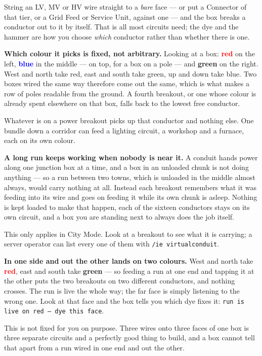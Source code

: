 String an LV, MV or HV wire straight to a \emph{bare} face --- or put a Connector of that tier, or a
Grid Feed or Service Unit, against one --- and the box breaks a conductor out to it by itself. That
is all most circuits need; the dye and the hammer are how you choose \emph{which} conductor rather
than whether there is one.

\textbf{Which colour it picks is fixed, not arbitrary.} Looking at a box: \textcolor{red}{\textbf{red}}
on the left, \textcolor{blue}{\textbf{blue}} in the middle --- on top, for a box on a pole ---
and \textcolor{green!50!black}{\textbf{green}} on the right. West and north take red, east and south
take green, up and down take blue. Two boxes wired the same way therefore come out the same, which
is what makes a row of poles readable from the ground. A fourth breakout, or one whose colour is
already spent elsewhere on that box, falls back to the lowest free conductor.

Whatever is on a power breakout picks up that conductor and nothing else. One bundle down a corridor
can feed a lighting circuit, a workshop and a furnace, each on its own colour.

\begin{ietip}
\textbf{A long run keeps working when nobody is near it.} A conduit hands power along one junction
box at a time, and a box in an unloaded chunk is not doing anything --- so a run between two towns,
which is unloaded in the middle almost always, would carry nothing at all. Instead each breakout
remembers what it was feeding into its wire and goes on feeding it while its own chunk is asleep.
Nothing is kept loaded to make that happen, each of the sixteen conductors stays on its own circuit,
and a box you are standing next to always does the job itself.

This only applies in City Mode. Look at a breakout to see what it is carrying; a server operator can
list every one of them with \texttt{/ie virtualconduit}.
\end{ietip}

\begin{iewarning}
\textbf{In one side and out the other lands on two colours.} West and north take
\textcolor{red}{\textbf{red}}, east and south take \textcolor{green!50!black}{\textbf{green}} --- so
feeding a run at one end and tapping it at the other puts the two breakouts on two different
conductors, and nothing crosses. The run is live the whole way; the far face is simply listening to
the wrong one. Look at that face and the box tells you which dye fixes it:
\texttt{run is live on red -- dye this face}.

This is not fixed for you on purpose. Three wires onto three faces of one box is three separate
circuits and a perfectly good thing to build, and a box cannot tell that apart from a run wired in
one end and out the other.
\end{iewarning}

